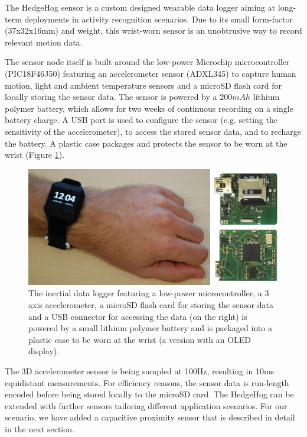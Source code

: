 \documentclass[runningheads,a4paper]{llncs}
\begin{document}
The HedgeHog sensor \cite{hedgehog} is a custom designed wearable data logger aiming at long-term deployments in activity recognition scenarios. Due to its small form-factor (37x32x16mm) and weight, this wrist-worn sensor is an unobtrusive way to record relevant motion data.


The sensor node itself is built around the low-power Microchip microcontroller (PIC18F46J50) featuring an accelerometer sensor (ADXL345) to capture human motion, light and ambient temperature sensors and a microSD flash card for locally storing the sensor data. The sensor is powered by a $200mAh$ lithium polymer battery, which allows for two weeks of continuous recording on a single battery charge. A USB port is used to configure the sensor (e.g. setting the sensitivity of the accelerometer), to access the stored sensor data, and to recharge the battery. A plastic case packages and protects the sensor to be worn at the wrist (Figure \ref{fig:sensornode}).

\begin{figure}
	\centering
	\includegraphics[width=\textwidth]{Images/hardware_sensor_2.jpg}
	\caption{The inertial data logger featuring a low-power microcontroller, a 3 axis accelerometer, a microSD flash card for storing the sensor data and a USB connector for accessing the data (on the right) is powered by a small lithium polymer battery and is packaged into a plastic case to be worn at the wrist (a version with an OLED display).}
	\label{fig:sensornode}
\end{figure}

The 3D accelerometer sensor is being sampled at 100Hz, resulting in 10ms equidistant measurements. For efficiency reasons, the sensor data is run-length encoded before being stored locally to the microSD card. 
The HedgeHog can be extended with further sensors tailoring different application scenarios. For our scenario, we have added a capacitive proximity sensor that is described in detail in the next section.
\end{document}
